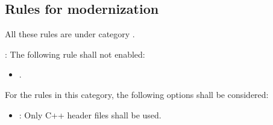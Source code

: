 \subsection{Rules for modernization}

All these rules are under category
.

: The following rule shall not enabled:
\begin{itemize}

\item {}.

\end{itemize}

For the rules in this category, the following options shall be considered:

\begin{itemize}

\item {}:
Only C++ header files shall be used.

\end{itemize}
